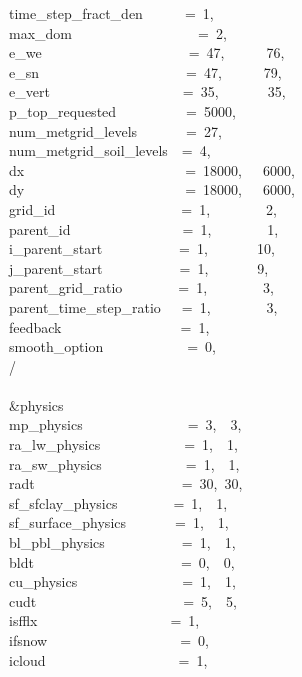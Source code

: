 time\_step\_fract\_den~~~~~~=~1,\\
max\_dom~~~~~~~~~~~~~~~~~~=~2,\\
e\_we~~~~~~~~~~~~~~~~~~~~~=~47,~~~~~~76,~~~~\\
e\_sn~~~~~~~~~~~~~~~~~~~~~=~47,~~~~~~79,~~~~\\
e\_vert~~~~~~~~~~~~~~~~~~~=~35,~~~~~~~35,~~~~\\
p\_top\_requested~~~~~~~~~~=~5000,\\
num\_metgrid\_levels~~~~~~~=~27,\\
num\_metgrid\_soil\_levels~~=~4,\\
dx~~~~~~~~~~~~~~~~~~~~~~~=~18000,~~~6000,\\
dy~~~~~~~~~~~~~~~~~~~~~~~=~18000,~~~6000,\\
grid\_id~~~~~~~~~~~~~~~~~~=~1,~~~~~~~~2,~~~~~~\\
parent\_id~~~~~~~~~~~~~~~~=~1,~~~~~~~~1,~~~~~~\\
i\_parent\_start~~~~~~~~~~~=~1,~~~~~~~10,~~~~~~\\
j\_parent\_start~~~~~~~~~~~=~1,~~~~~~~9,~~~~~~\\
parent\_grid\_ratio~~~~~~~~=~1,~~~~~~~~3,~~~~~~\\
parent\_time\_step\_ratio~~~=~1,~~~~~~~~3,~~~~~~\\
feedback~~~~~~~~~~~~~~~~~=~1,\\
smooth\_option~~~~~~~~~~~~=~0,\\
/\\
\\
\&physics~~~~~~~~~~~~~~~~~\\
mp\_physics~~~~~~~~~~~~~~~=~3,~~3,~\\
ra\_lw\_physics~~~~~~~~~~~~=~1,~~1,~\\
ra\_sw\_physics~~~~~~~~~~~~=~1,~~1,~\\
radt~~~~~~~~~~~~~~~~~~~~~=~30,~30,\\
sf\_sfclay\_physics~~~~~~~~=~1,~~1,~\\
sf\_surface\_physics~~~~~~~=~1,~~1,~\\
bl\_pbl\_physics~~~~~~~~~~~=~1,~~1,~\\
bldt~~~~~~~~~~~~~~~~~~~~~=~0,~~0,~\\
cu\_physics~~~~~~~~~~~~~~~=~1,~~1,~\\
cudt~~~~~~~~~~~~~~~~~~~~~=~5,~~5,~\\
isfflx~~~~~~~~~~~~~~~~~~~=~1,\\
ifsnow~~~~~~~~~~~~~~~~~~~=~0,\\
icloud~~~~~~~~~~~~~~~~~~~=~1,\\
